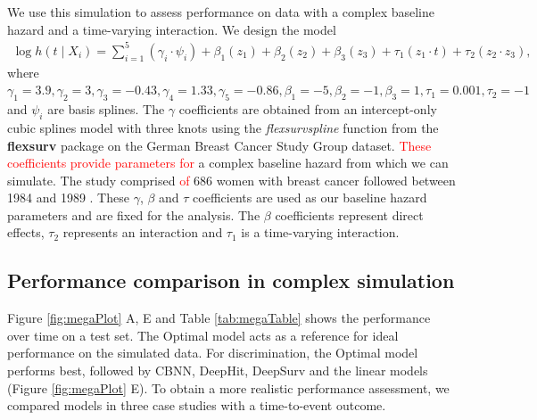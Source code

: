 \documentclass[preprint,12pt,authoryear]{elsarticle}
\begin{document}
We use this simulation to assess performance on data with a complex baseline hazard and a time-varying interaction. We design the model \begin{align}
\log h(t \mid X_i) =\sum_{i=1}^{5} (\gamma_{i} \cdot \psi_{i}) + \beta_{{1}} (z_{1}) + \beta_{{2}} (z_{2})+ \beta_{{3}} (z_{3})+ \tau_{1} ( z_{1} \cdot t)+ \tau_{2} (z_{2} \cdot z_{3}), \nonumber
\end{align} where
\(\gamma_{1}=3.9, \gamma_{2}=3, \gamma_{3}=-0.43, \gamma_{4}=1.33,\gamma_{5}=-0.86, \beta_{{1}}=-5, \beta_{{2}}=-1, \beta_{{3}}=1, \tau_{1}=0.001, \tau_{2}=-1\) and \(\psi_{i}\) are basis splines. The \(\gamma\) coefficients are obtained from an intercept-only cubic splines model with three knots using the \emph{flexsurvspline} function from the \textbf{flexsurv} package \citep{flexsurv} on the German Breast Cancer Study Group dataset. \textcolor{red}{These coefficients provide parameters for} a complex baseline hazard from which we can simulate. The study comprised \textcolor{red}{of} 686 women with breast cancer followed between 1984 and 1989 \citep{royston2002flexible}. These $\gamma$, $\beta$ and $\tau$ coefficients are used as our baseline hazard parameters and are fixed for the analysis. The \(\beta\) coefficients represent direct effects, \(\tau_{2}\) represents an interaction and \(\tau_{1}\) is a time-varying interaction.

\hypertarget{performance-comparison-in-complex-simulation}{%
\subsection{Performance comparison in complex
simulation}\label{performance-comparison-in-complex-simulation}}


Figure \ref{fig:megaPlot} A, E and Table \ref{tab:megaTable} shows the performance over time on a test set. The Optimal model acts as a reference for ideal performance on the simulated data. For discrimination, the Optimal model performs best, followed by CBNN, DeepHit, DeepSurv and the linear models (Figure \ref{fig:megaPlot} E). To obtain a more realistic performance assessment, we compared models in three case studies with a time-to-event outcome.
\end{document}
